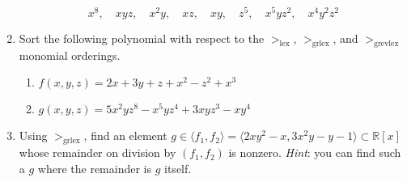 \documentclass[11pt]{report}
\newcommand\RR{{\mathbb R}}
\newcommand\lex{>_{\operatorname{lex}}}
\newcommand\grlex{>_{\operatorname{grlex}}}
\newcommand\grevlex{>_{\operatorname{grevlex}}}
\begin{document}
\begin{enumerate}
$$ x^8, \quad xyz, \quad x^2y, \quad xz, \quad xy, \quad z^5, \quad x^5yz^2, \quad x^4y^2z^2$$

\item Sort the following polynomial with respect to the $\lex$, $\grlex$, and $\grevlex$ monomial
orderings.

\begin{enumerate}

\item $f(x,y,z) = 2x + 3y +z + x^2 -z^2 + x^3$

\item $g(x,y,z) = 5x^2yz^8 - x^5yz^4 +3xyz^3 - xy^4$

\end{enumerate}

\item Using $\grlex$, find an element $g \in \langle f_1, f_2 \rangle = \langle 2xy^2-x, 3x^2y - y -1\rangle
\subset \RR[x]$  whose remainder on division by $(f_1, f_2)$ is nonzero.  \emph{Hint}: you can
find such a $g$ where the remainder is $g$ itself.

\end{enumerate}
\end{document}
